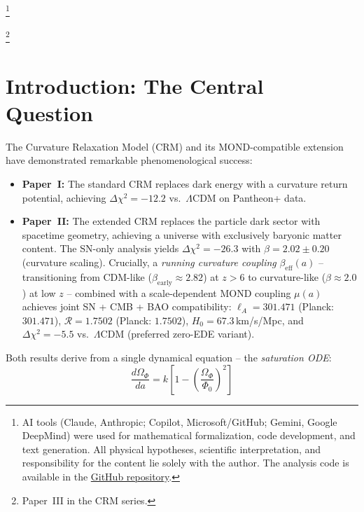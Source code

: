 \documentclass[aps,prd,twocolumn,superscriptaddress,nofootinbib]{revtex4-2}
\begin{document}
\thanks{AI tools (Claude, Anthropic; Copilot, Microsoft/GitHub; Gemini, Google DeepMind) were used for mathematical formalization, code development, and text generation. All physical hypotheses, scientific interpretation, and responsibility for the content lie solely with the author. The analysis code is available in the \href{https://github.com/research-line/crm-cosmology}{GitHub repository}.}

\thanks{Paper~III in the CRM series.}

\maketitle


\section{Introduction: The Central Question}
\label{sec:intro}

The Curvature Relaxation Model (CRM) \cite{Geiger2026} and its MOND-compatible extension \cite{Geiger2026b} have demonstrated remarkable phenomenological success:

\begin{itemize}
\item \textbf{Paper~I:} The standard CRM replaces dark energy with a curvature return potential, achieving $\Delta\chi^2 = -12.2$ vs.\ $\Lambda$CDM on Pantheon+ data.
\item \textbf{Paper~II:} The extended CRM replaces the particle dark sector with spacetime geometry, achieving a universe with exclusively baryonic matter content. The SN-only analysis yields $\Delta\chi^2 = -26.3$ with $\beta = 2.02 \pm 0.20$ (curvature scaling). Crucially, a \textit{running curvature coupling} $\beta_{\mathrm{eff}}(a)$ -- transitioning from CDM-like ($\beta_{\mathrm{early}} \approx 2.82$) at $z > 6$ to curvature-like ($\beta \approx 2.0$) at low $z$ -- combined with a scale-dependent MOND coupling $\mu(a)$ achieves joint SN + CMB + BAO compatibility: $\ell_A = 301.471$ (Planck: $301.471$), $\mathcal{R} = 1.7502$ (Planck: $1.7502$), $H_0 = 67.3$\,km/s/Mpc, and $\Delta\chi^2 = -5.5$ vs.\ $\Lambda$CDM (preferred zero-EDE variant).
\end{itemize}

Both results derive from a single dynamical equation -- the \textit{saturation ODE}:
\begin{equation}
\frac{d\Omega_\Phi}{da} = k \left[1 - \left(\frac{\Omega_\Phi}{\Phi_0}\right)^2\right]
\label{eq:saturation_ode}
\end{equation}
\end{document}
